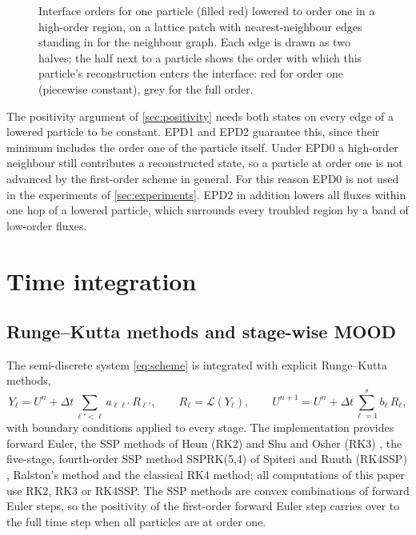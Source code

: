 \documentclass[11pt,a4paper]{article}
\numberwithin{equation}{section}
\newcommand{\Lop}{\mathcal{L}}
\begin{document}
\begin{figure}[!htbp]
\centering

\caption{Interface orders for one particle (filled red) lowered to order one in a high-order region, on a lattice patch with nearest-neighbour edges standing in for the neighbour graph. Each edge is drawn as two halves; the half next to a particle shows the order with which this particle's reconstruction enters the interface: red for order one (piecewise constant), grey for the full order.}\label{fig:epd}
\end{figure}

The positivity argument of \cref{sec:positivity} needs both states on every edge of a lowered particle to be constant. EPD1 and EPD2 guarantee this, since their minimum includes the order one of the particle itself. Under EPD0 a high-order neighbour still contributes a reconstructed state, so a particle at order one is not advanced by the first-order scheme in general. For this reason EPD0 is not used in the experiments of \cref{sec:experiments}. EPD2 in addition lowers all fluxes within one hop of a lowered particle, which surrounds every troubled region by a band of low-order fluxes.

\section{Time integration}\label{sec:time}

\subsection{Runge--Kutta methods and stage-wise MOOD}\label{sec:stagemood}

The semi-discrete system \eqref{eq:scheme} is integrated with explicit Runge--Kutta methods,
\begin{equation}\label{eq:rk}
Y_\ell = U^n+\Delta t\sum_{\ell'<\ell}a_{\ell\ell'}\,R_{\ell'},\qquad R_\ell=\Lop(Y_\ell),\qquad U^{n+1}=U^n+\Delta t\sum_{\ell=1}^sb_\ell\,R_\ell,
\end{equation}
with boundary conditions applied to every stage. The implementation provides forward Euler, the SSP methods of Heun (RK2) and Shu and Osher (RK3) \cite{ShuOsher1988,Gottlieb2001}, the five-stage, fourth-order SSP method SSPRK(5,4) of Spiteri and Ruuth (RK4SSP) \cite{SpiteriRuuth2002}, Ralston's method and the classical RK4 method; all computations of this paper use RK2, RK3 or RK4SSP. The SSP methods are convex combinations of forward Euler steps, so the positivity of the first-order forward Euler step carries over to the full time step when all particles are at order one.
\end{document}
